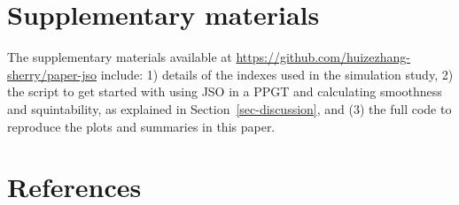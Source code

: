 \documentclass[
  12pt,
]{interact}
\theoremstyle{plain}
\begin{document}
\section*{Supplementary materials}\label{supplementary-materials}

The supplementary materials available at
\url{https://github.com/huizezhang-sherry/paper-jso} include: 1) details
of the indexes used in the simulation study, 2) the script to get
started with using JSO in a PPGT and calculating smoothness and
squintability, as explained in Section~\ref{sec-discussion}, and (3) the
full code to reproduce the plots and summaries in this paper.

\section*{References}\label{references}
\end{document}
